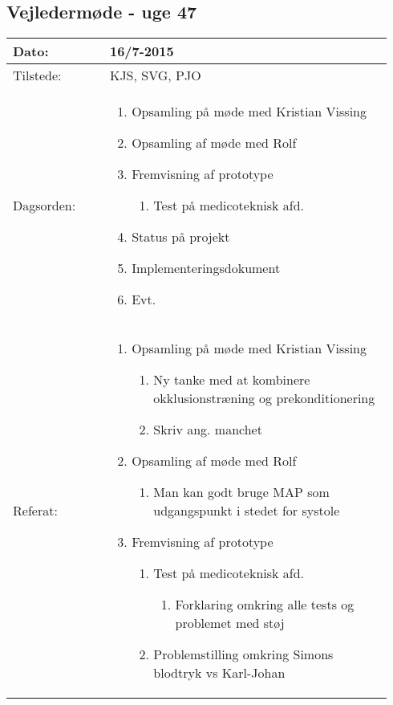 	\subsection{Vejledermøde - uge 47} \label{app:vejlederuge47}
	\begin{longtable}{|p{0.24\linewidth}|p{0.7\linewidth}|}
		\hline
		Dato: & 16/7-2015\\ \hline
		Tilstede: & KJS, SVG, PJO\\ \hline
		Dagsorden: &
		\begin{enumerate}
			\item Opsamling på møde med Kristian Vissing
			\item Opsamling af møde med Rolf
			\item Fremvisning af prototype
			\begin{enumerate}
				\item Test på medicoteknisk afd.
			\end{enumerate} 
			\item Status på projekt
			\item Implementeringsdokument
			\item Evt. 
		\end{enumerate}
		\\ \hline
		Referat: & 
		\begin{enumerate}
			\item Opsamling på møde med Kristian Vissing
			\begin{enumerate}
				\item Ny tanke med at kombinere okklusionstræning og prekonditionering 
				\item Skriv ang. manchet
			\end{enumerate}
			\item Opsamling af møde med Rolf
			\begin{enumerate}
				\item Man kan godt bruge MAP som udgangspunkt i stedet for systole
			\end{enumerate}
			\item Fremvisning af prototype
			\begin{enumerate}
				\item Test på medicoteknisk afd. 
				\begin{enumerate}
					\item Forklaring omkring alle tests og problemet med støj
				\end{enumerate}
				\item Problemstilling omkring Simons blodtryk vs Karl-Johan 

\end{enumerate}
\end{enumerate}
\end{longtable}
